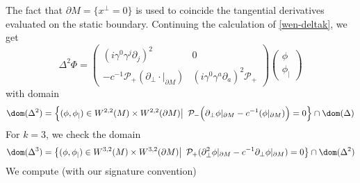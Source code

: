The fact that $\partial M = \{x^\bot = 0\}$ is used to coincide the tangential derivatives evaluated on the static boundary.
Continuing the calculation of \cref{wen-deltak}, we get
\begin{equation}\label{wen-delta2}
\Delta^2 \Phi = \begin{pmatrix} (i \gamma^0 \gamma^j\partial_j)^2 & 0 \\ 
- c^{-1}\mathcal{P}_+( \partial_\bot \cdot\vert_{\partial M} ) & 
(i \gamma^0 \gamma^a \partial_a)^2 \mathcal{P}_+ \end{pmatrix}
\begin{pmatrix} \phi \\ \phi_| \end{pmatrix}
\end{equation}
with domain 
\begin{equation*}
\dom(\Delta^2) = \Big\{ (\phi, \phi_|) \in W^{2,2}(M)\times W^{2,2}(\partial M) \big\vert\enskip \mathcal{P}_- \Big(\partial_\bot\phi\vert_{\partial M} - c^{-1} (\phi\vert_{\partial M}) \Big) = 0 \Big\} \cap \dom(\Delta)
\end{equation*}
For $k = 3$, 
we check the domain
\begin{equation*}
\dom(\Delta^3) = \big\{ (\phi, \phi_|)\in W^{3,2}(M)\times W^{3,2}(\partial M) \big\vert \enskip \mathcal{P}_+(\partial_\bot^2 \phi\vert_{\partial M} - c^{-1}\partial_\bot \phi\vert_{\partial M} ) = 0 \big\} 
\cap \dom(\Delta^2)
\end{equation*}
We compute (with our signature convention)
